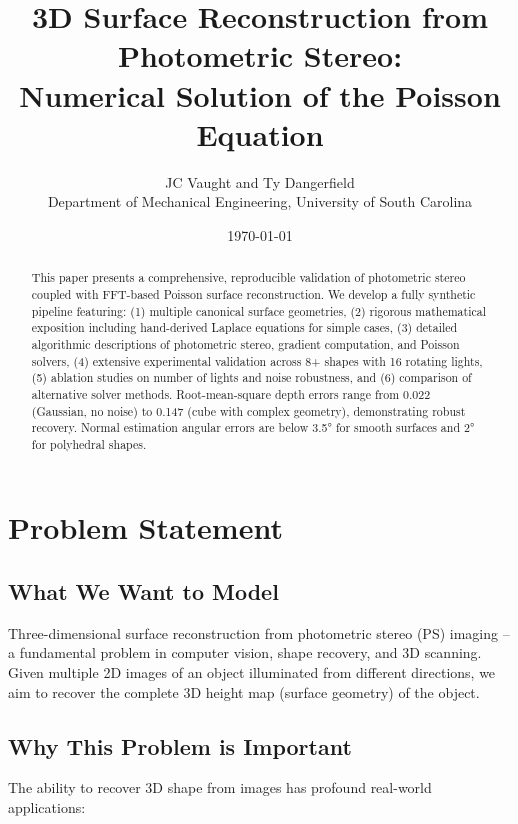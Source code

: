 \documentclass[11pt]{article}
\title{\LARGE\bfseries 3D Surface Reconstruction from Photometric Stereo: \\Numerical Solution of the Poisson Equation}
\author{JC Vaught and Ty Dangerfield \\ Department of Mechanical Engineering, University of South Carolina}
\date{\today}
\begin{document}
\maketitle

\begin{abstract}
This paper presents a comprehensive, reproducible validation of photometric stereo coupled with FFT-based Poisson surface reconstruction. 
We develop a fully synthetic pipeline featuring: (1) multiple canonical surface geometries, (2) rigorous mathematical exposition including hand-derived Laplace equations for simple cases, (3) detailed algorithmic descriptions of photometric stereo, gradient computation, and Poisson solvers, (4) extensive experimental validation across 8+ shapes with 16 rotating lights, (5) ablation studies on number of lights and noise robustness, and (6) comparison of alternative solver methods. Root-mean-square depth errors range from 0.022 (Gaussian, no noise) to 0.147 (cube with complex geometry), demonstrating robust recovery. Normal estimation angular errors are below 3.5° for smooth surfaces and 2° for polyhedral shapes.
\end{abstract}

\vspace{1em}
\newpage
\section{Problem Statement}\label{sec:problem}

\subsection{What We Want to Model}

Three-dimensional surface reconstruction from photometric stereo (PS) imaging -- a fundamental problem in computer vision, shape recovery, and 3D scanning. Given multiple 2D images of an object illuminated from different directions, we aim to recover the complete 3D height map (surface geometry) of the object.

\subsection{Why This Problem is Important}

The ability to recover 3D shape from images has profound real-world applications:
\end{document}
